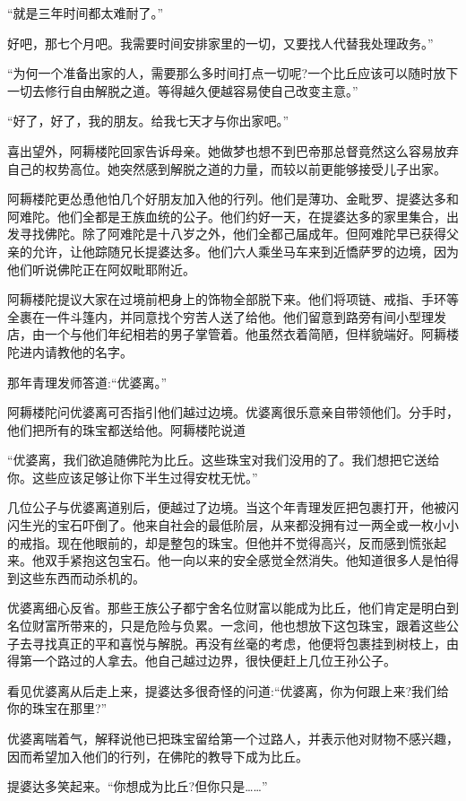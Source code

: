 \documentclass[12pt,twoside,openany]{book}
\begin{document}
“就是三年时间都太难耐了。”

好吧，那七个月吧。我需要时间安排家里的一切，又要找人代替我处理政务。”

“为何一个准备出家的人，需要那么多时间打点一切呢?一个比丘应该可以随时放下一切去修行自由解脱之道。等得越久便越容易使自己改变主意。”

“好了，好了，我的朋友。给我七天才与你出家吧。”

喜出望外，阿耨楼陀回家告诉母亲。她做梦也想不到巴帝那总督竟然这么容易放弃自己的权势高位。她突然感到解脱之道的力量，而较以前更能够接受儿子出家。

阿耨楼陀更怂恿他怕几个好朋友加入他的行列。他们是薄功、金毗罗、提婆达多和阿难陀。他们全都是王族血统的公子。他们约好一天，在提婆达多的家里集合，出发寻找佛陀。除了阿难陀是十八岁之外，他们全都己届成年。但阿难陀早已获得父亲的允许，让他踪随兄长提婆达多。他们六人乘坐马车来到近憍萨罗的边境，因为他们听说佛陀正在阿奴毗耶附近。

阿耨楼陀提议大家在过境前杷身上的饰物全部脱下来。他们将项链、戒指、手环等全裹在一件斗篷内，并同意找个穷苦人送了给他。他们留意到路旁有间小型理发店，由一个与他们年纪相若的男子掌管着。他虽然衣着简陋，但样貌端好。阿耨楼陀进内请教他的名字。

那年青理发师答道:“优婆离。”

阿耨楼陀问优婆离可否指引他们越过边境。优婆离很乐意亲自带领他们。分手时，他们把所有的珠宝都送给他。阿耨楼陀说道

“优婆离，我们欲追随佛陀为比丘。这些珠宝对我们没用的了。我们想把它送给你。这些应该足够让你下半生过得安枕无忧。”

几位公子与优婆离道别后，便越过了边境。当这个年青理发匠把包裹打开，他被闪闪生光的宝石吓倒了。他来自社会的最低阶层，从来都没拥有过一两全或一枚小小的戒指。现在他眼前的，却是整包的珠宝。但他并不觉得高兴，反而感到慌张起来。他双手紧抱这包宝石。他一向以来的安全感觉全然消失。他知道很多人是怕得到这些东西而动杀机的。

优婆离细心反省。那些王族公子都宁舍名位财富以能成为比丘，他们肯定是明白到名位财富所带来的，只是危险与负累。一念间，他也想放下这包珠宝，跟着这些公子去寻找真正的平和喜悦与解脱。再没有丝毫的考虑，他便将包裹挂到树枝上，由得第一个路过的人拿去。他自己越过边界，很快便赶上几位王孙公子。

看见优婆离从后走上来，提婆达多很奇怪的问道:“优婆离，你为何跟上来?我们给你的珠宝在那里?”

优婆离喘着气，解释说他已把珠宝留给第一个过路人，并表示他对财物不感兴趣，因而希望加入他们的行列，在佛陀的教导下成为比丘。

提婆达多笑起来。“你想成为比丘?但你只是……”
\end{document}
